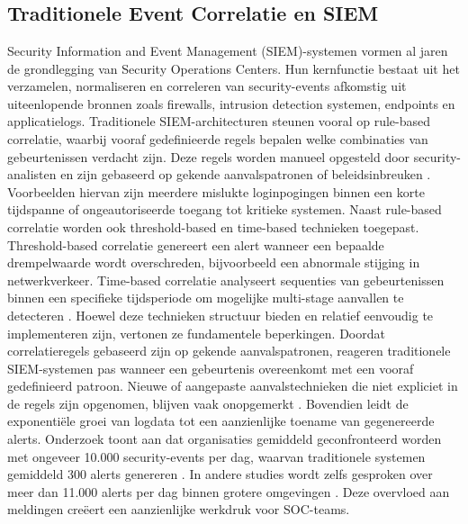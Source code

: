 \chapter{}%
\label{ch:stand-van-zaken}

\section{Traditionele Event Correlatie en SIEM}

Security Information and Event Management (SIEM)-systemen vormen al jaren de grondlegging van Security Operations Centers. Hun kernfunctie bestaat uit het verzamelen, normaliseren en correleren van security-events afkomstig uit uiteenlopende bronnen zoals firewalls, intrusion detection systemen, endpoints en applicatielogs.
\newline
\newline
Traditionele SIEM-architecturen steunen vooral op rule-based correlatie, waarbij vooraf gedefinieerde regels bepalen welke combinaties van gebeurtenissen verdacht zijn. Deze regels worden manueel opgesteld door security-analisten en zijn gebaseerd op gekende aanvalspatronen of beleidsinbreuken \autocite{Upadhyay2025}. Voorbeelden hiervan zijn meerdere mislukte loginpogingen binnen een korte tijdspanne of ongeautoriseerde toegang tot kritieke systemen.
\newline
\newline
Naast rule-based correlatie worden ook threshold-based en time-based technieken toegepast. Threshold-based correlatie genereert een alert wanneer een bepaalde drempelwaarde wordt overschreden, bijvoorbeeld een abnormale stijging in netwerkverkeer. Time-based correlatie analyseert sequenties van gebeurtenissen binnen een specifieke tijdsperiode om mogelijke multi-stage aanvallen te detecteren \autocite{Upadhyay2025}.
\newline
\newline
Hoewel deze technieken structuur bieden en relatief eenvoudig te implementeren zijn, vertonen ze fundamentele beperkingen. Doordat correlatieregels gebaseerd zijn op gekende aanvalspatronen, reageren traditionele SIEM-systemen pas wanneer een gebeurtenis overeenkomt met een vooraf gedefinieerd patroon. Nieuwe of aangepaste aanvalstechnieken die niet expliciet in de regels zijn opgenomen, blijven vaak onopgemerkt \autocite{Upadhyay2025}.
\newline
\newline
Bovendien leidt de exponentiële groei van logdata tot een aanzienlijke toename van gegenereerde alerts. Onderzoek toont aan dat organisaties gemiddeld geconfronteerd worden met ongeveer 10.000 security-events per dag, waarvan traditionele systemen gemiddeld 300 alerts genereren \autocite{Sivakumaran2025}. In andere studies wordt zelfs gesproken over meer dan 11.000 alerts per dag binnen grotere omgevingen \autocite{Sivakumaran2025}. Deze overvloed aan meldingen creëert een aanzienlijke werkdruk voor SOC-teams.

